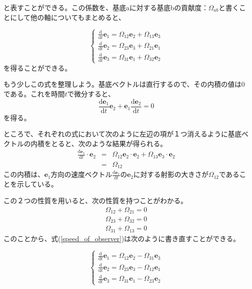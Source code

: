 \documentclass[twocolumn,a4j,10pt]{jarticle}
\begin{document}
と表すことができる。この係数を、基底aに対する基底bの貢献度：$\Omega_{ab}$と書くことにして他の軸についてもまとめると、

\begin{equation}
  \left\{ \begin{array}{rl}
\frac{\mathrm{d} }{\mathrm{d} t} \bm{e}_1 = \Omega_{12} \bm{e}_2 + \Omega_{13} \bm{e}_3 \\
\frac{\mathrm{d} }{\mathrm{d} t} \bm{e}_2 = \Omega_{23} \bm{e}_3 + \Omega_{21} \bm{e}_1 \\
\frac{\mathrm{d} }{\mathrm{d} t} \bm{e}_3 = \Omega_{31} \bm{e}_1 + \Omega_{32} \bm{e}_2
  \label{speed_of_observer}
  \end{array} \right.
\end{equation}\newline
を得ることができる。\newline

もう少しこの式を整理しよう。基底ベクトルは直行するので、その内積の値は0である。これを時間$t$で微分すると、
\begin{equation}
  \frac{\mathrm{d} \bm{e}_1}{\mathrm{d} t} \bm{e}_2 + \bm{e}_1 \frac{\mathrm{d} \bm{e}_2}{\mathrm{d} t} = 0 \nonumber
\end{equation}
を得る。

ところで、それぞれの式において次のように左辺の項が１つ消えるように基底ベクトルの内積をとると、次のような結果が得られる。
\begin{eqnarray}
  \frac{\mathrm{d} \bm{e}_1}{\mathrm{d} t} \cdot \bm{e}_2 &=& \Omega_{12} \bm{e}_2 \cdot \bm{e}_2 + \Omega_{13} \bm{e}_3 \cdot \bm{e}_2 \nonumber \\
  &=& \Omega_{12} \nonumber
\end{eqnarray}
この内積は、$\bm{e}_1$方向の速度ベクトル$\frac{\mathrm{d} \bm{e}_1}{\mathrm{d} t}$の$\bm{e}_2$に対する射影の大きさが$\Omega_{12}$であることを示している。

この２つの性質を用いると、次の性質を持つことがわかる。
\begin{eqnarray}
  \Omega_{12} + \Omega_{21} = 0 \nonumber \\
  \Omega_{23} + \Omega_{32} = 0 \nonumber \\
  \Omega_{31} + \Omega_{13} = 0 \nonumber
\end{eqnarray}
このことから、式(\ref{speed_of_observer})は次のように書き直すことができる。

\begin{equation}
  \left\{ \begin{array}{rl}
\frac{\mathrm{d} }{\mathrm{d} t} \bm{e}_1 = \Omega_{12} \bm{e}_2 - \Omega_{31} \bm{e}_3 \\
\frac{\mathrm{d} }{\mathrm{d} t} \bm{e}_2 = \Omega_{23} \bm{e}_3 - \Omega_{12} \bm{e}_1 \\
\frac{\mathrm{d} }{\mathrm{d} t} \bm{e}_3 = \Omega_{31} \bm{e}_1 - \Omega_{23} \bm{e}_2
  \label{speed_of_observer_2}
  \end{array} \right.
\end{equation}\newline
\end{document}
